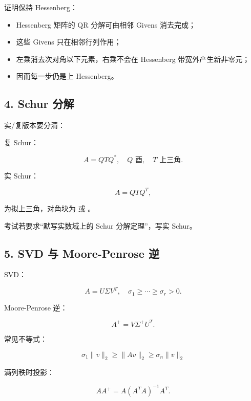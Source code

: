 \documentclass[11pt,a4paper]{ctexart}
\newcommand{\code}[1]{\begingroup\ttfamily\small #1\endgroup}
\begin{document}
证明保持 Hessenberg：

\begin{itemize}

\item Hessenberg 矩阵的 QR 分解可由相邻 Givens 消去完成；

\item 这些 Givens 只在相邻行列作用；

\item 左乘消去次对角以下元素，右乘不会在 Hessenberg 带宽外产生新非零元；

\item 因而每一步仍是上 Hessenberg。

\end{itemize}


\subsection*{4. Schur 分解}


实/复版本要分清：

复 Schur：

\[
A=QTQ^*,\quad Q \text{ 酉},\quad T \text{ 上三角}.
\]

实 Schur：

\[
A=QTQ^T,
\]

\code{} 为拟上三角，对角块为 \code{} 或 \code{}。

考试若要求“默写实数域上的 Schur 分解定理”，写实 Schur。


\subsection*{5. SVD 与 Moore-Penrose 逆}


SVD：

\[
A=U\Sigma V^T,\quad
\sigma_1\ge \cdots\ge \sigma_r>0.
\]

Moore-Penrose 逆：

\[
A^+=V\Sigma^+U^T.
\]

常见不等式：

\[
\sigma_1\|v\|_2\ge \|Av\|_2\ge \sigma_n\|v\|_2
\]

满列秩时投影：

\[
AA^+=A(A^TA)^{-1}A^T.
\]
\end{document}
